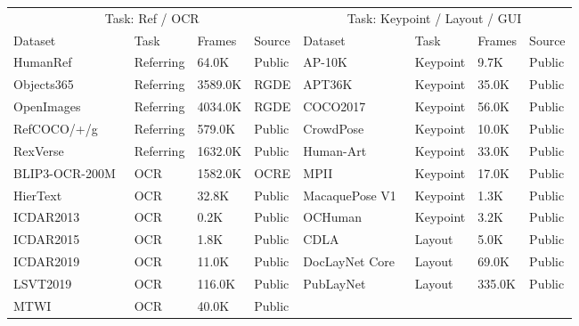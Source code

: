 \begin{table}[htbp]
    \centering
    \small
    \setlength{\tabcolsep}{4pt}
    \renewcommand{\arraystretch}{0.88}
    \begin{tabular}{l|l|l|l||l|l|l|l}
        \toprule
        \multicolumn{4}{c||}{Task: Ref / OCR} & \multicolumn{4}{c}{Task: Keypoint / Layout / GUI} \\
        \cmidrule(lr){1-4} \cmidrule(lr){5-8}
        Dataset & Task & Frames & Source & Dataset & Task & Frames & Source \\
        \midrule
        HumanRef~\cite{zhang2024humanref} & Referring & 64.0K & Public
        & AP-10K~\cite{yu2021ap} & Keypoint & 9.7K & Public \\
        Objects365~\cite{shao2019objects365} & Referring & 3589.0K & RGDE
        & APT36K~\cite{yang2022apt} & Keypoint & 35.0K & Public \\
        OpenImages~\cite{OpenImages} & Referring & 4034.0K & RGDE
        & COCO2017~\cite{lin2014microsoft} & Keypoint & 56.0K & Public \\
        RefCOCO/+/g~\cite{yu2016modeling,kazemzadeh-etal-2014-referitgame} & Referring & 579.0K & Public
        & CrowdPose~\cite{li2018crowdpose} & Keypoint & 10.0K & Public \\
        RexVerse~\cite{jiang2024chatrextamingmultimodalllm} & Referring & 1632.0K & Public
        & Human-Art~\cite{ju2023human} & Keypoint & 33.0K & Public \\
        BLIP3-OCR-200M~\cite{Xue2024BLIP3AF} & OCR & 1582.0K & OCRE
        & MPII~\cite{MPII} & Keypoint & 17.0K & Public \\
        HierText~\cite{long2022towards,long2023icdar} & OCR & 32.8K & Public
        & MacaquePose V1~\cite{labuguen2021macaquepose} & Keypoint & 1.3K & Public \\
        ICDAR2013~\cite{ICDAR2013} & OCR & 0.2K & Public
        & OCHuman~\cite{zhang2019pose2seg} & Keypoint & 3.2K & Public \\
        ICDAR2015~\cite{ICDAR2015} & OCR & 1.8K & Public
        & CDLA~\cite{buptlihang2021cdla} & Layout & 5.0K & Public \\
        ICDAR2019~\cite{ICDAR2019} & OCR & 11.0K & Public
        & DocLayNet Core~\cite{pfitzmann2022doclaynet} & Layout & 69.0K & Public \\
        LSVT2019~\cite{sun2019lsvt} & OCR & 116.0K & Public
        & PubLayNet~\cite{zhong2019publaynet} & Layout & 335.0K & Public \\
        MTWI~\cite{he2018mtwi} & OCR & 40.0K & Public

\end{tabular}
\end{table}
